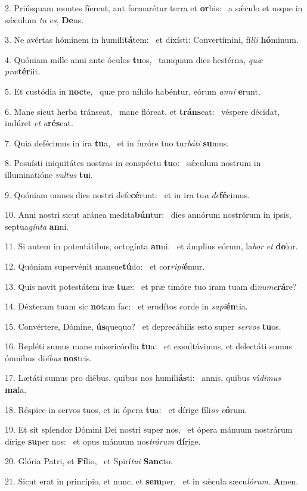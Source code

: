 2. Priúsquam montes fíerent, aut formarétur terra et \textbf{or}bis: \ast\  a sǽculo et usque in sǽculum \textit{tu} \textit{es}, \textbf{De}us.\

3. Ne avértas hóminem in humili\textbf{tá}tem: \ast\  et dixísti: Convertímini, fí\textit{li}\textit{i} \textbf{hó}minum.\

4. Quóniam mille anni ante óculos \textbf{tu}os, \ast\  tamquam dies hestérna, \textit{quæ} \textit{præ}\textbf{tér}iit.\

5. Et custódia in \textbf{noc}te, \ast\  quæ pro níhilo habéntur, eórum \textit{an}\textit{ni} \textbf{e}runt.\

6. Mane sicut herba tránseat, \dag\  mane flóreat, et \textbf{tráns}eat: \ast\  véspere décidat, indúret \textit{et} \textit{a}\textbf{rés}cat.\

7. Quia defécimus in ira \textbf{tu}a, \ast\  et in furóre tuo tur\textit{bá}\textit{ti} \textbf{su}mus.\

8. Posuísti iniquitátes nostras in conspéctu \textbf{tu}o: \ast\  sǽculum nostrum in illuminatióne \textit{vul}\textit{tus} \textbf{tu}i.\

9. Quóniam omnes dies nostri defe\textbf{cé}runt: \ast\  et in ira tu\textit{a} \textit{de}\textbf{fé}cimus.\

10. Anni nostri sicut aránea medita\textbf{bún}tur: \ast\  dies annórum nostrórum in ipsis, septua\textit{gín}\textit{ta} \textbf{an}ni.\

11. Si autem in potentátibus, octogínta \textbf{an}ni: \ast\  et ámplius eórum, la\textit{bor} \textit{et} \textbf{do}lor.\

12. Quóniam supervénit mansue\textbf{tú}do: \ast\  et cor\textit{ri}\textit{pi}\textbf{é}mur.\

13. Quis novit potestátem iræ \textbf{tu}æ: \ast\  et præ timóre tuo iram tuam di\textit{nu}\textit{me}\textbf{rá}re?\

14. Déxteram tuam sic \textbf{no}tam fac: \ast\  et erudítos corde in \textit{sa}\textit{pi}\textbf{én}tia.\

15. Convértere, Dómine, \textbf{ús}quequo? \ast\  et deprecábilis esto super \textit{ser}\textit{vos} \textbf{tu}os.\

16. Repléti sumus mane misericórdia \textbf{tu}a: \ast\  et exsultávimus, et delectáti sumus ómnibus di\textit{é}\textit{bus} \textbf{nos}tris.\

17. Lætáti sumus pro diébus, quibus nos humili\textbf{ás}ti: \ast\  annis, quibus ví\textit{di}\textit{mus} \textbf{ma}la.\

18. Réspice in servos tuos, et in ópera \textbf{tu}a: \ast\  et dírige fíli\textit{os} \textit{e}\textbf{ó}rum.\

19. Et sit splendor Dómini Dei nostri super nos, \dag\  et ópera mánuum nostrárum dírige \textbf{su}per nos: \ast\  et opus mánuum nos\textit{trá}\textit{rum} \textbf{dí}rige.\

20. Glória Patri, et \textbf{Fí}lio, \ast\  et Spirí\textit{tu}\textit{i} \textbf{Sanc}to.\

21. Sicut erat in princípio, et nunc, et \textbf{sem}per, \ast\  et in sǽcula sæcu\textit{ló}\textit{rum}. \textbf{A}men.\

